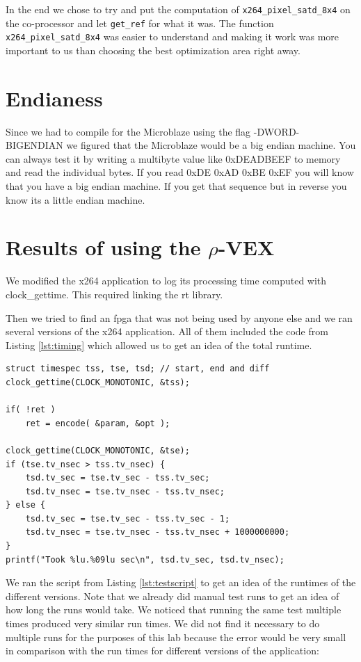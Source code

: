 \documentclass{article}
\newcommand{\rvex}{\ensuremath{\rho}-VEX}
\newcommand{\satd}{\texttt{x264\_pixel\_satd\_8x4}}
\newcommand{\getref}{\texttt{get\_ref}}
\begin{document}
In the end we chose to try and put the computation of \satd{} on the
co-processor and let \getref{} for what it was. The function \satd{} was easier
to understand and making it work was more important to us than choosing the
best optimization area right away.

\section{Endianess}

Since we had to compile for the Microblaze using the flag -DWORD-BIGENDIAN we
figured that the Microblaze would be a big endian machine. You can always test
it by writing a multibyte value like 0xDEADBEEF to memory and read the
individual bytes. If you read 0xDE 0xAD 0xBE 0xEF you will know that you have a
big endian machine. If you get that sequence but in reverse you know its a
little endian machine.

\section{Results of using the \rvex{}}

We modified the x264 application to log its processing time computed with
clock\_gettime. This required linking the rt library.

Then we tried to find an fpga that was not being used by anyone else and we ran
several versions of the x264 application. All of them included the code from Listing \ref{lst:timing} which allowed us to get an idea of the total runtime. 

\begin{lstlisting}[style=C,caption=Capturing runtime with the monotonic clock,label=lst:timing]
struct timespec tss, tse, tsd; // start, end and diff
clock_gettime(CLOCK_MONOTONIC, &tss);

if( !ret )
    ret = encode( &param, &opt );

clock_gettime(CLOCK_MONOTONIC, &tse);
if (tse.tv_nsec > tss.tv_nsec) {
    tsd.tv_sec = tse.tv_sec - tss.tv_sec;
    tsd.tv_nsec = tse.tv_nsec - tss.tv_nsec;
} else {
    tsd.tv_sec = tse.tv_sec - tss.tv_sec - 1;
    tsd.tv_nsec = tse.tv_nsec - tss.tv_nsec + 1000000000;
}
printf("Took %lu.%09lu sec\n", tsd.tv_sec, tsd.tv_nsec);
\end{lstlisting}

We ran the script from Listing \ref{lst:testscript} to get an idea of the runtimes of the different versions. Note that we already did manual test runs to get an idea of how long the runs would take. We noticed that running the same test multiple times produced very similar run times. We did not find it necessary to do multiple runs for the purposes of this lab because the error would be very small in comparison with the run times for different versions of the application:
\end{document}
